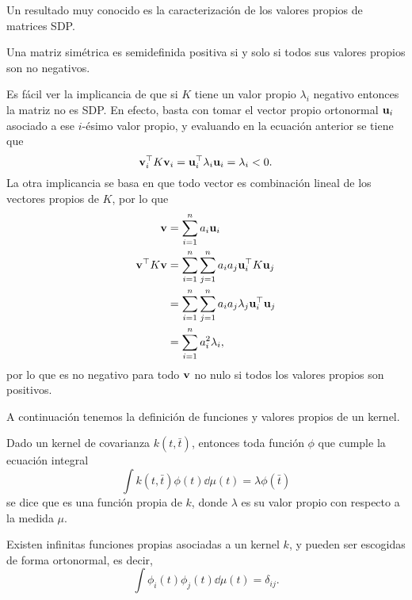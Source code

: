 Un resultado muy conocido es la caracterización de los valores propios de matrices SDP.

\begin{proposition}
	Una matriz simétrica es semidefinida positiva si y solo si todos sus valores propios son no negativos.
\end{proposition}

Es fácil ver la implicancia de que si \(K\) tiene un valor propio \(\lambda_{i}\) negativo entonces la matriz no es SDP. En efecto, basta con tomar el vector propio ortonormal \(\mathbf{u}_{i}\) asociado a ese \(i\)-ésimo valor propio, y evaluando en la ecuación anterior se tiene que
\begin{equation*}
\mathbf{v}_{i}^{\top} K\mathbf{v}_{i} = \mathbf{u}_{i}^{\top} \lambda_{i} \mathbf{u}_{i} = \lambda_{i} < 0.
\end{equation*}%
La otra implicancia se basa en que todo vector es combinación lineal de los vectores propios de \(K\), por lo que
\begin{align*}
\mathbf{v}				&= \sum_{i=1}^{n} a_{i} \mathbf{u}_{i} \\
\mathbf{v}^{\top}K\mathbf{v}	&= \sum_{i=1}^{n} \sum_{j=1}^{n} a_{i} a_{j} \mathbf{u}_{i}^{\top} K \mathbf{u}_{j} \\
&= \sum_{i=1}^{n} \sum_{j=1}^{n} a_{i}a_{j} \lambda_j \mathbf{u}_{i}^{\top} \mathbf{u}_{j}\\
&= \sum_{i=1}^{n} a_{i}^{2} \lambda_{i},
\end{align*}
por lo que es no negativo para todo \(\mathbf{v}\) no nulo si todos los valores propios son positivos.

A continuación tenemos la definición de funciones y valores propios de un kernel.


\begin{definition}
	Dado un kernel de covarianza \(k(t, \bar{t})\), entonces toda función \(\phi\) que cumple la ecuación integral
	\begin{equation*}
		\int k(t, \bar{t}) \phi(t) \dd{\mu} \left(t\right) = \lambda \phi(\bar{t})
	\end{equation*}
	se dice que es una función propia de \(k\), donde \(\lambda\) es su valor propio con respecto a la medida \(\mu\).
\end{definition}

\begin{proposition}
	Existen infinitas funciones propias asociadas a un kernel \(k\), y pueden ser escogidas de forma ortonormal, es decir,
	\[\int \phi_{i} (t) \phi_{j}(t) \dd{\mu(t)} = \delta_{ij}.\]
\end{proposition}

